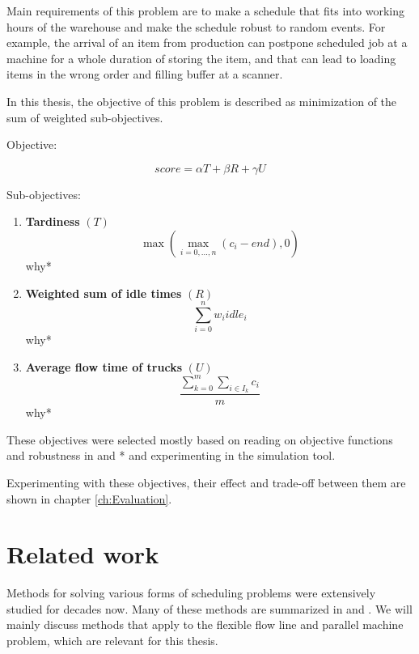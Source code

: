 \documentclass{ctuthesis}
\begin{document}
Main requirements of this problem are to make a schedule that fits into working hours of the warehouse and make the schedule robust to random events. For example, the arrival of an item from production can postpone scheduled job at a machine for a whole duration of storing the item, and that can lead to loading items in the wrong order and filling buffer at a scanner. 

In this thesis, the objective of this problem is described as minimization of the sum of weighted sub-objectives.

Objective:

\begin{equation}
    score = \alpha T + \beta R + \gamma  U
\end{equation}

Sub-objectives:

\begin{enumerate}
\item \textbf{Tardiness} $(T)$\\ \begin{equation}\max(\max_{i=0,\ldots,n}( c_i - end), 0)\end{equation}
why*
\item \textbf{Weighted sum of idle times} $(R)$\\ 
\begin{equation}
    \sum_{i=0}^{n} w_iidle_i
\end{equation}
why*
\item \textbf{Average flow time of trucks} $(U)$
\begin{equation} 
    \dfrac{\sum_{k=0}^{m} \sum_{i \in I_k} c_i}{m}
\end{equation}
why*
\end{enumerate}

 These objectives were selected mostly based on reading on objective functions and robustness in \cite{pinedo} and \cite{tkindt}* and experimenting in the simulation tool. 
 
 Experimenting with these objectives, their effect and trade-off between them are shown in chapter \ref{ch:Evaluation}.

\chapter{Related work}
\label{chap:Related work}
Methods for solving various forms of scheduling problems were extensively studied for decades now. Many of these methods are summarized in \cite{pinedo} and \cite{bucker}. We will mainly discuss methods that apply to the flexible flow line and parallel machine problem, which are relevant for this thesis. 
\end{document}

